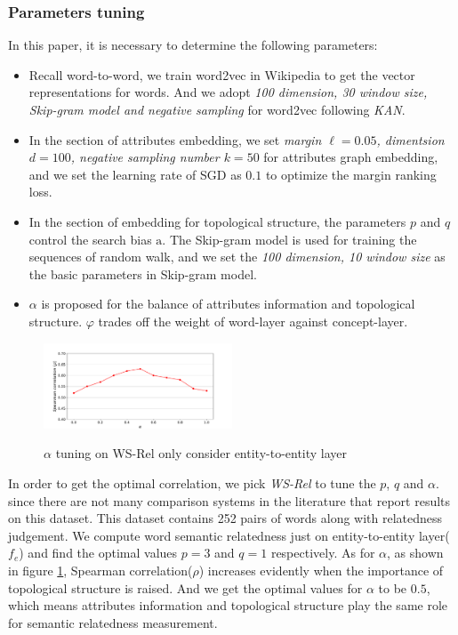 \subsubsection{Parameters tuning}
In this paper, it is necessary to determine the following parameters:
\begin{itemize}
\item Recall word-to-word, we train word2vec in Wikipedia to get the vector representations for words.
And we adopt \emph{100 dimension, 30 window size, Skip-gram model and negative sampling} for word2vec
following \emph{KAN}. 

\item In the section of attributes embedding, we set \emph{margin $\ell=0.05$, dimentsion $d=100$, negative sampling number $k=50$} for 
attributes graph embedding, and we set the learning rate of SGD as $0.1$ to optimize the margin ranking loss.

\item In the section of embedding for topological structure, the parameters $p$ and $q$ control the search bias $\mathrm{a}$.
The Skip-gram model is used for training the sequences of random walk, and we set the \emph{100 dimension, 10 window size} 
as the basic parameters in Skip-gram model.

\item $\alpha$ is proposed for the balance of attributes information and topological structure. $\varphi$ trades off the weight
of word-layer against concept-layer.
\end{itemize}

\begin{figure}
    \flushleft
    \includegraphics[width=0.5\textwidth]{pic/params_alpha.pdf}\\
    \caption{$\alpha$ tuning on WS-Rel only consider entity-to-entity layer}
    \label{alpha}
\end{figure}

In order to get the optimal correlation, we pick \emph{WS-Rel}\cite{ws/AgirreAHKPS09} to tune the $p$, $q$ and $\alpha$.
since there are not many comparison systems in the literature that report results on this dataset.
This dataset contains 252 pairs of words along with relatedness judgement.
We compute word semantic relatedness just on entity-to-entity layer($f_e$) and find the optimal values
$p=3$ and $q=1$ respectively. As for $\alpha$, as shown in figure \ref{alpha}, Spearman correlation($\rho$) increases evidently
when the importance of topological structure is raised. And we get the optimal values for $\alpha$ to be $0.5$,
which means attributes information and topological structure play the same role for semantic relatedness measurement.


